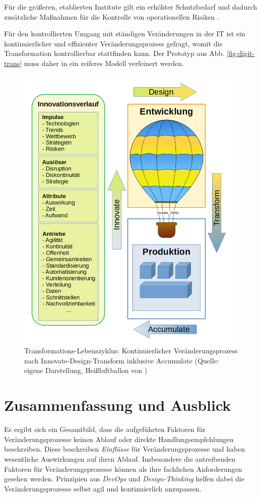 Für die größeren, etablierten Institute gilt ein erhöhter Schutzbedarf \cite{recht/Bornemann2018} und dadurch zusätzliche Maßnahmen für die Kontrolle von operationellen Risiken \cite{MaRisk:2017, BAIT:2018}.

Für den kontrollierten Umgang mit ständigen Veränderungen in der IT ist ein kontinuierlicher und effizienter Veränderungsprozess gefragt, womit die Transformation kontrollierbar stattfinden kann. Der Prototyp aus Abb. \ref{fig:digit-trans} muss daher in ein reiferes Modell verfeinert werden.
 
 \begin{figure}[htbp]
 \centering
 \includegraphics[width=1.0\textwidth]{gfx/digital-transformation-lifecycle-by-selim4.PNG}
 \caption{Transformations-Lebenszyklus: Kontinuierlicher Veränderungsprozess nach Innovate-Design-Transform inklusive Accumulate (Quelle: eigene Darstellung, Heißluftballon von \citet{maidis_2006})\label{fig:digit-trans-idt}
 }
 \end{figure}

\section{Zusammenfassung und Ausblick}
Es ergibt sich ein Gesamtbild, dass die aufgeführten Faktoren für Veränderungsprozesse keinen Ablauf oder direkte Handlungsempfehlungen beschreiben. Diese beschreiben \emph{Einflüsse} für Veränderungsprozesse und haben wesentliche Auswirkungen auf ihren Ablauf. Insbesondere die antreibenden Faktoren für Veränderungsprozesse können als ihre fachlichen Anforderungen gesehen werden. Prinzipien aus \emph{DevOps} und \emph{Design-Thinking} helfen dabei die Veränderungsprozesse selbst agil und kontinuierlich anzupassen. 

